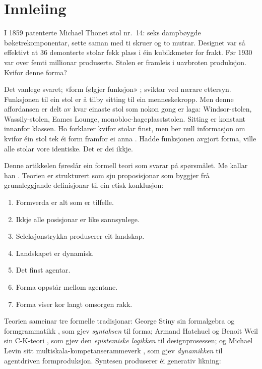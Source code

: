 \section{Innleiing}
\label{sec:introduction-nn}

I 1859 patenterte Michael Thonet stol nr.~14: seks dampbøygde bøketrekomponentar, sette saman med ti skruer og to mutrar. Designet var så effektivt at 36 demonterte stolar fekk plass i éin kubikkmeter for frakt. Før 1930 var over femti millionar produserte. Stolen er framleis i uavbroten produksjon. Kvifor denne forma?

Det vanlege svaret; «form følgjer funksjon» \parencite{Sullivan1896}; sviktar ved nærare ettersyn. Funksjonen til ein stol er å tilby sitting til ein menneskekropp. Men denne affordansen er delt av kvar einaste stol som nokon gong er laga: Windsor-stolen, Wassily-stolen, Eames Lounge, monobloc-hageplasststolen. Sitting er konstant innanfor klassen. Ho forklarer kvifor stolar finst, men ber null informasjon om kvifor éin stol tek éi form framfor ei anna \parencite{Michl1995}. Hadde funksjonen avgjort forma, ville alle stolar vore identiske. Det er dei ikkje.

Denne artikkelen føreslår ein formell teori som svarar på spørsmålet. Me kallar han \formlaere{}. Teorien er strukturert som sju proposisjonar som byggjer frå grunnleggjande definisjonar til ein etisk konklusjon:

\begin{enumerate}
\item Formverda er alt som er tilfelle.
\item Ikkje alle posisjonar er like sannsynlege.
\item Seleksjonstrykka produserer eit landskap.
\item Landskapet er dynamisk.
\item Det finst agentar.
\item Forma oppstår mellom agentane.
\item Forma viser kor langt omsorgen rakk.
\end{enumerate}

Teorien sameinar tre formelle tradisjonar: George Stiny sin formalgebra og formgrammatikk \parencite{Stiny1972, Stiny2006}, som gjev \textit{syntaksen} til forma; Armand Hatchuel og Benoit Weil sin C-K-teori \parencite{Hatchuel2003, Hatchuel2009}, som gjev den \textit{epistemiske logikken} til designprosessen; og Michael Levin sitt multiskala-kompetanserammeverk \parencite{Levin2022, Fields2022, Doctor2024}, som gjev \textit{dynamikken} til agentdriven formproduksjon. Syntesen produserer éi generativ likning:

